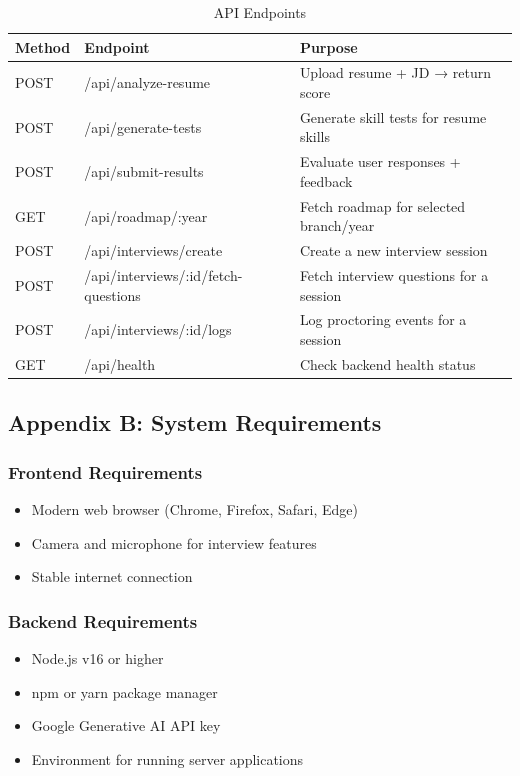 \documentclass[12pt, conference]{IEEEtran}
\begin{document}
\begin{table}[H]
\centering
\caption{API Endpoints}
\begin{tabular}{|l|l|l|}
\hline
\textbf{Method} & \textbf{Endpoint} & \textbf{Purpose} \\
\hline
POST & /api/analyze-resume & Upload resume + JD → return score \\
\hline
POST & /api/generate-tests & Generate skill tests for resume skills \\
\hline
POST & /api/submit-results & Evaluate user responses + feedback \\
\hline
GET & /api/roadmap/:year & Fetch roadmap for selected branch/year \\
\hline
POST & /api/interviews/create & Create a new interview session \\
\hline
POST & /api/interviews/:id/fetch-questions & Fetch interview questions for a session \\
\hline
POST & /api/interviews/:id/logs & Log proctoring events for a session \\
\hline
GET & /api/health & Check backend health status \\
\hline
\end{tabular}
\end{table}

\subsection*{Appendix B: System Requirements}

\subsubsection*{Frontend Requirements}
\begin{itemize}
    \item Modern web browser (Chrome, Firefox, Safari, Edge)
    \item Camera and microphone for interview features
    \item Stable internet connection
\end{itemize}

\subsubsection*{Backend Requirements}
\begin{itemize}
    \item Node.js v16 or higher
    \item npm or yarn package manager
    \item Google Generative AI API key
    \item Environment for running server applications
\end{itemize}
\end{document}
